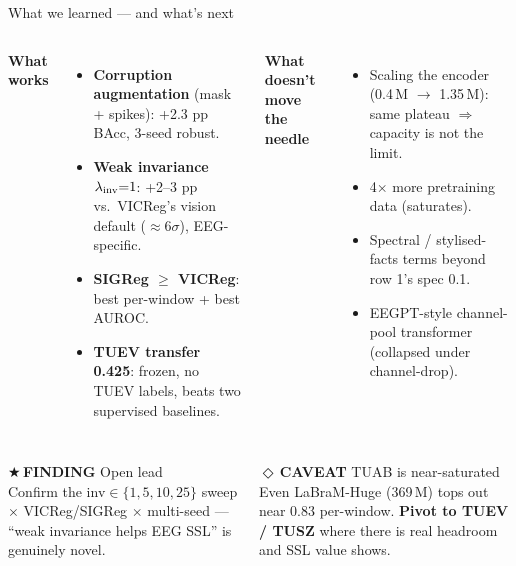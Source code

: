 \documentclass[aspectratio=169,11pt]{beamer}
\newcommand{\caveattag}{\textcolor{tplred}{\scriptsize\sffamily\bfseries$\Diamond$\,CAVEAT}\xspace}
\newcommand{\findingtag}{\textcolor{tplgold}{\scriptsize\sffamily\bfseries$\bigstar$\,FINDING}\xspace}
\newcommand{\sectionheader}[1]{\renewcommand{\insertsection}{#1}}
\begin{document}
\sectionheader{CONCLUSION}
\begin{frame}{What we learned --- and what's next}
\begin{columns}[T,onlytextwidth]
\textbf{\textcolor{tplgreen}{What works}}
\begin{itemize}\setlength\itemsep{0pt}
\item \textbf{Corruption augmentation} (mask + spikes): +2.3 pp BAcc, 3-seed robust.
\item \textbf{Weak invariance} $\lambda_{\rm inv}{=}1$: +2--3 pp vs.\ VICReg's vision default
  ($\approx6\sigma$), EEG-specific.
\item \textbf{SIGReg $\geq$ VICReg}: best per-window + best AUROC.
\item \textbf{TUEV transfer 0.425}: frozen, no TUEV labels, beats two supervised baselines.
\end{itemize}

\textbf{\textcolor{tplred}{What doesn't move the needle}}
\begin{itemize}\setlength\itemsep{0pt}
\item Scaling the encoder (0.4\,M $\to$ 1.35\,M): same plateau $\Rightarrow$ capacity is not the limit.
\item 4$\times$ more pretraining data (saturates).
\item Spectral / stylised-facts terms beyond row 1's spec 0.1.
\item EEGPT-style channel-pool transformer (collapsed under channel-drop).
\end{itemize}
\end{columns}

\vspace{0.6em}
\begin{columns}[T,onlytextwidth]
\begin{findingbox}\findingtag Open lead\\[0.2em]
\small Confirm the inv$\in\{1,5,10,25\}$ sweep $\times$ VICReg/SIGReg
$\times$ multi-seed --- ``weak invariance helps EEG SSL'' is genuinely novel.
\end{findingbox}

\begin{caveatbox}\caveattag TUAB is near-saturated\\[0.2em]
\small Even LaBraM-Huge (369\,M) tops out near 0.83 per-window. \textbf{Pivot to
TUEV / TUSZ} where there is real headroom and SSL value shows.
\end{caveatbox}
\end{columns}
\end{frame}
\end{document}
